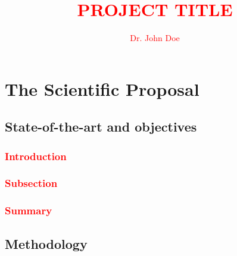 \documentclass[B2]{ercgrant}
\author{\textcolor{red}{Dr. John Doe}}
\title{\textcolor{red}{PROJECT TITLE}}
\begin{document}
\maketitle



\chapter{The Scientific Proposal}


\section{State-of-the-art and objectives}\label{sec:stateofart}

\subsection*{\textcolor{red}{Introduction}}\label{sec:stateofart:intro}
\textcolor{red}{\blindtext[5]}


\subsection*{\textcolor{red}{Subsection}}\label{sec:stateofart:subsection}
\textcolor{red}{\blindtext[2]}

\textcolor{red}{\blindtext[2]}


\subsection*{\textcolor{red}{Summary}}\label{sec:stateofart:summary}
\textcolor{red}{\blindtext[5]}


\section{Methodology}
\textcolor{red}{\blindtext[5]}
\end{document}
